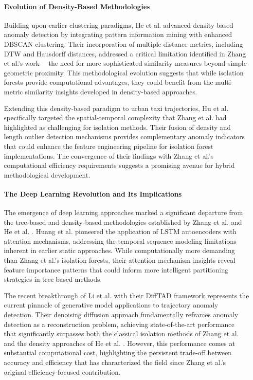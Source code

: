 \documentclass[runningheads]{llncs}
\begin{document}
\paragraph{Evolution of Density-Based Methodologies}
Building upon earlier clustering paradigms, He et al. \cite{he2019based} advanced density-based anomaly detection by integrating pattern information mining with enhanced DBSCAN clustering. Their incorporation of multiple distance metrics, including DTW and Hausdorff distances, addressed a critical limitation identified in Zhang et al.'s work \cite{zhang2011ibat}—the need for more sophisticated similarity measures beyond simple geometric proximity. This methodological evolution suggests that while isolation forests provide computational advantages, they could benefit from the multi-metric similarity insights developed in density-based approaches.

Extending this density-based paradigm to urban taxi trajectories, Hu et al. \cite{hu2019based} specifically targeted the spatial-temporal complexity that Zhang et al. \cite{zhang2011ibat} had highlighted as challenging for isolation methods. Their fusion of density and length outlier detection mechanisms provides complementary anomaly indicators that could enhance the feature engineering pipeline for isolation forest implementations. The convergence of their findings with Zhang et al.'s computational efficiency requirements suggests a promising avenue for hybrid methodological development.

\paragraph{The Deep Learning Revolution and Its Implications}
The emergence of deep learning approaches marked a significant departure from the tree-based and density-based methodologies established by Zhang et al. \cite{zhang2011ibat} and He et al. \cite{he2019based}. Huang et al. \cite{huang2021vehicle} pioneered the application of LSTM autoencoders with attention mechanisms, addressing the temporal sequence modeling limitations inherent in earlier static approaches. While computationally more demanding than Zhang et al.'s isolation forests, their attention mechanism insights reveal feature importance patterns that could inform more intelligent partitioning strategies in tree-based methods.

The recent breakthrough of Li et al. \cite{LI2024111387} with their DiffTAD framework represents the current pinnacle of generative model applications to trajectory anomaly detection. Their denoising diffusion approach fundamentally reframes anomaly detection as a reconstruction problem, achieving state-of-the-art performance that significantly surpasses both the classical isolation methods of Zhang et al. \cite{zhang2011ibat} and the density approaches of He et al. \cite{he2019based}. However, this performance comes at substantial computational cost, highlighting the persistent trade-off between accuracy and efficiency that has characterized the field since Zhang et al.'s original efficiency-focused contribution.
\end{document}
